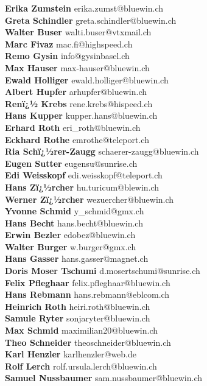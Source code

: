 \documentclass{scrartcl}
\begin{document}
\textbf{Erika Zumstein } erika.zumst@bluewin.ch\\
\textbf{Greta Schindler } greta.schindler@bluewin.ch\\
\textbf{Walter Buser } walti.buser@vtxmail.ch\\
\textbf{Marc Fivaz } mac.fi@highspeed.ch\\
\textbf{Remo Gysin } info@gysinbasel.ch\\
\textbf{Max Hauser } max-hauser@bluewin.ch\\
\textbf{Ewald Holliger } ewald.holliger@bluewin.ch\\
\textbf{Albert Hupfer } arhupfer@bluewin.ch\\
\textbf{Renï¿½ Krebs                  \n	 } rene.krebs@hispeed.ch\\
\textbf{Hans Kupper } kupper.hans@bluewin.ch\\
\textbf{Erhard Roth } eri_roth@bluewin.ch\\
\textbf{Eckhard Rothe } emrothe@teleport.ch\\
\textbf{Ria Schï¿½rer-Zaugg                  \n	 } schaerer-zaugg@bluewin.ch\\
\textbf{Eugen Sutter } eugensu@sunrise.ch\\
\textbf{Edi Weisskopf } edi.weisskopf@teleport.ch\\
\textbf{Hans Zï¿½rcher                  \n	 } hu.turicum@blewin.ch\\
\textbf{Werner Zï¿½rcher                  \n	 } wezuercher@bluewin.ch\\
\textbf{Yvonne Schmid } y_schmid@gmx.ch\\
\textbf{Hans Becht } hans.becht@bluewin.ch\\
\textbf{Erwin Bezler } edobez@bluewin.ch\\
\textbf{Walter Burger } w.burger@gmx.ch\\
\textbf{Hans Gasser } hans.gasser@magnet.ch\\
\textbf{Doris Moser Tschumi } d.mosertschumi@sunrise.ch\\
\textbf{Felix Pfleghaar } felix.pfleghaar@bluewin.ch\\
\textbf{Hans Rebmann } hans.rebmann@eblcom.ch\\
\textbf{Heinrich Roth } heiri.roth@bluewin.ch\\
\textbf{Samule Ryter } sonjaryter@bluewin.ch\\
\textbf{Max Schmid } maximilian20@bluewin.ch\\
\textbf{Theo Schneider } theoschneider@bluewin.ch\\
\textbf{Karl Henzler } karlhenzler@web.de\\
\textbf{Rolf Lerch } rolf.ursula.lerch@bluewin.ch\\
\textbf{Samuel Nussbaumer } sam.nussbaumer@bluewin.ch\\
\end{document}
